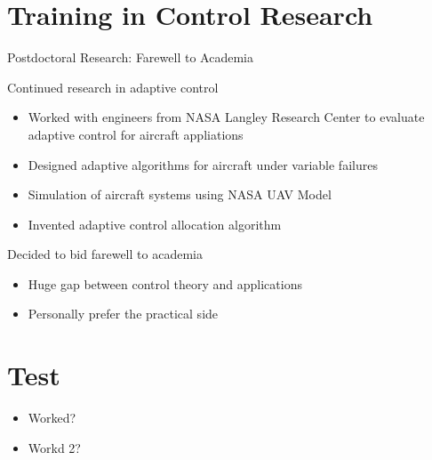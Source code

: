 \documentclass[presentation]{beamer}
\begin{document}
\section{Training in Control Research}
\label{sec:orgd6eb087}
\begin{frame}[label={sec:org7118e3e}]{Postdoctoral Research: Farewell to Academia}
\begin{block}{Continued research in adaptive control}
\begin{itemize}
\item Worked with engineers from NASA Langley Research Center to evaluate
adaptive control for aircraft appliations
\item Designed adaptive algorithms for aircraft under variable failures
\item Simulation of aircraft systems using NASA UAV Model
\item Invented adaptive control allocation algorithm
\end{itemize}
\end{block}
\begin{block}{Decided to bid farewell to academia}
\begin{itemize}
\item Huge gap between control theory and applications
\item Personally prefer the practical side
\end{itemize}
\end{block}
\end{frame}

\section{Test}
\label{sec:org95f0a95}
\begin{itemize}
\item Worked?\\
\item Workd 2?
\end{itemize}
\end{document}

